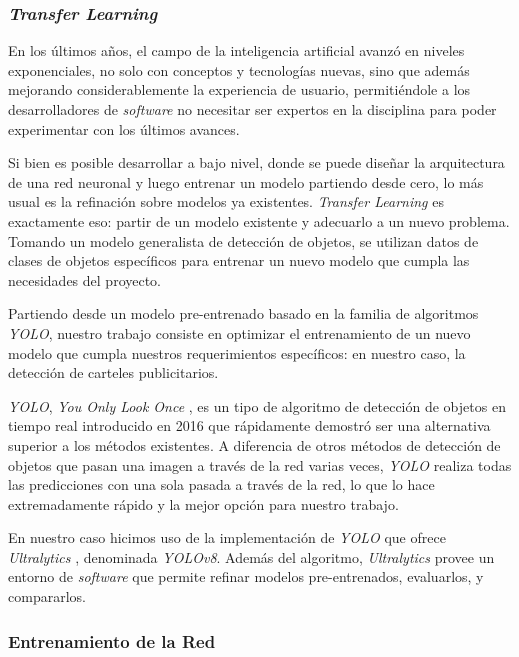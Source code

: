 \documentclass[a4paper]{article}
\begin{document}
\subsubsection{\textit{Transfer Learning}}

En los últimos años, el campo de la inteligencia artificial avanzó en niveles exponenciales, no solo con conceptos y tecnologías nuevas, sino que además mejorando considerablemente la experiencia de usuario, permitiéndole a los desarrolladores de \textit{software} no necesitar ser expertos en la disciplina para poder experimentar con los últimos avances.

Si bien es posible desarrollar a bajo nivel, donde se puede diseñar la arquitectura de una red neuronal y luego entrenar un modelo partiendo desde cero, lo más usual es la refinación sobre modelos ya existentes. \textit{Transfer Learning} es exactamente eso: partir de un modelo existente y adecuarlo a un nuevo problema. Tomando un modelo generalista de detección de objetos, se utilizan datos de clases de objetos específicos para entrenar un nuevo modelo que cumpla las necesidades del proyecto.\medskip

Partiendo desde un modelo pre-entrenado basado en la familia de algoritmos \textit{YOLO}, nuestro trabajo consiste en optimizar el entrenamiento de un nuevo modelo que cumpla nuestros requerimientos específicos: en nuestro caso, la detección de carteles publicitarios.

\textit{YOLO}, \textit{You Only Look Once} \cite{yolov1}, es un tipo de algoritmo de detección de objetos en tiempo real introducido en 2016 que rápidamente demostró ser una alternativa superior a los métodos existentes. A diferencia de otros métodos de detección de objetos que pasan una imagen a través de la red varias veces, \textit{YOLO} realiza todas las predicciones con una sola pasada a través de la red, lo que lo hace extremadamente rápido y la mejor opción para nuestro trabajo.

En nuestro caso hicimos uso de la implementación de \textit{YOLO} que ofrece \textit{Ultralytics} \cite{ultralytics}, denominada \textit{YOLOv8}. Además del algoritmo, \textit{Ultralytics} provee un entorno de \textit{software} que permite refinar modelos pre-entrenados, evaluarlos, y compararlos.

\subsubsection{Entrenamiento de la Red}
\end{document}
